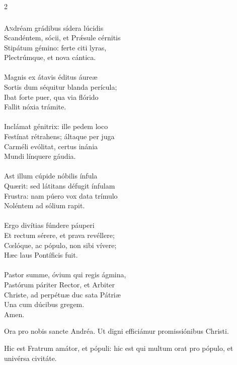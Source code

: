 \documentclass[9pt,twoside]{extarticle}
\begin{document}
\begin{multicols}{2}
\subsubsection*{\center {}}
\lettrine{A}ndréam grádibus sídera lúcidis\\
Scandéntem, sócii, et Prǽsule cérnitis\\
Stipátum gémino: ferte citi lyras,\\
Plectrúmque, et nova cántica.\\
\\
Magnis ex átavis éditus áureæ\\
Sortis dum séquitur blanda perícula;\\
Ibat forte puer, qua via flórido\\
Fallit nóxia trámite.\\
\\
Inclámat génitrix: ille pedem loco\\
Festínat rétrahens; áltaque per juga\\
Carméli evólitat, certus inánia\\
Mundi línquere gáudia.\\
\\
Ast illum cúpide nóbilis ínfula\\
Quærit: sed látitans défugit ínfulam\\
Frustra: nam púero vox data trímulo\\
Noléntem ad sólium rapit.\\
\\
Ergo divítias fúndere páuperi\\
Et rectum sérere, et prava revéllere;\\
Cœlóque, ac pópulo, non sibi vívere;\\
Hæc laus Pontíficis fuit.\\
\\
Pastor summe, óvium qui regis ágmina,\\
Pastórum páriter Rector, et Arbiter\\
Christe, ad perpétuæ duc sata Pátriæ\\
Una cum dúcibus gregem.\\
Amen.

\begin{tightlist}{}
\item {} Ora pro nobis sancte Andréa.  Ut digni efficiámur promissiónibus Christi.
\item {} Hic est Fratrum amátor, et pópuli: hic est qui multum orat pro pópulo, et univérsa civitáte.
\end{tightlist}


\end{multicols}
\end{document}
